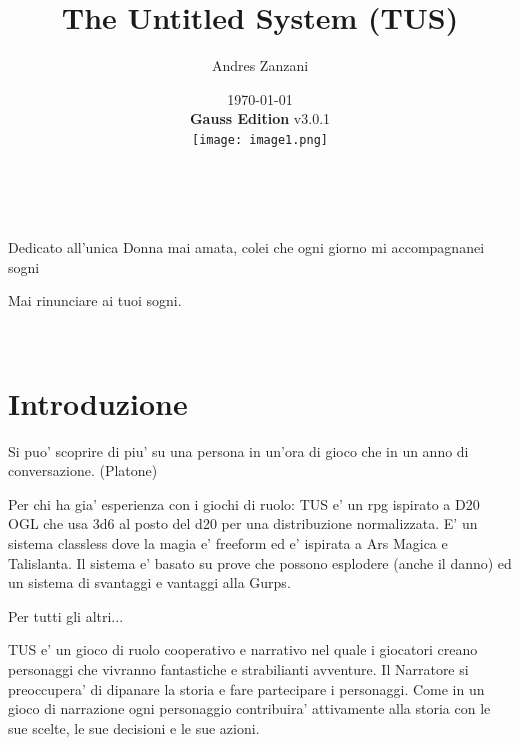 \documentclass[a4paper,11pt,twoside,openany]{dndbook}
\begin{document}
\title{The Untitled System (TUS)}
\date{\today\\\textbf{Gauss Edition} v3.0.1\\\texttt{[image: image1.png]}}
\author{Andres Zanzani}
\maketitle
\thispagestyle{empty}

\newpage~\newpage~




Dedicato all'unica Donna mai amata, colei che ogni giorno mi accompagnanei sogni

Mai rinunciare ai tuoi sogni.
\thispagestyle{empty}

\newpage~\thispagestyle{empty}%

\setcounter{page}{0}

\tableofcontents{}

\pagebreak{}

\section{Introduzione}

\pagestyle{plain} 
\begin{quotebox}Si puo' scoprire di piu' su una persona in un'ora di gioco che in un anno di conversazione. (Platone)
\end{quotebox}

Per chi ha gia' esperienza con i giochi di ruolo: TUS e' un rpg ispirato a D20 OGL che usa 3d6 al posto del d20 per una distribuzione normalizzata. E' un sistema classless dove la magia e' freeform ed e' ispirata a Ars Magica e Talislanta. Il sistema e' basato su prove che possono esplodere (anche il danno) ed un sistema di svantaggi e vantaggi alla Gurps. 

Per tutti gli altri...

TUS e' un gioco di ruolo cooperativo e narrativo nel quale i giocatori creano personaggi che vivranno fantastiche e strabilianti avventure. Il Narratore si preoccupera' di dipanare la storia e fare partecipare i personaggi. Come in un gioco di narrazione ogni personaggio contribuira' attivamente alla storia con le sue scelte, le sue decisioni e le sue azioni.
\end{document}
